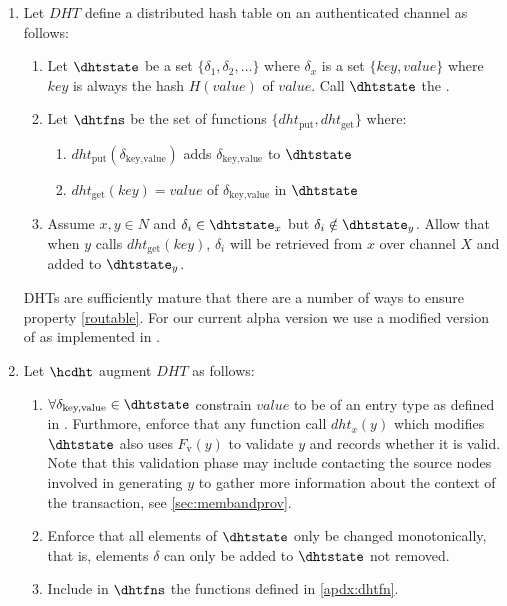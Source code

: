 \documentclass[twocolumn,showpacs,
  nofootinbib,aps,superscriptaddress,
  eqsecnum,prd,notitlepage,showkeys,10pt]{revtex4-1}
\begin{document}
\begin{enumerate}
\item Let $DHT$ define a distributed hash table on an authenticated channel as follows:
\begin{enumerate}

\item Let $\dhtstate$ be a set $\{\delta_1,\delta_2,\dots\}$ where $\delta_x$ is a set $\{key,value\}$ where $key$ is always the hash $H(value)$ of $value$.  Call $\dhtstate$ the .
\item Let $\dhtfns$ be the set of functions $\{dht_\text{put},dht_\text{get}\}$ where:
\begin{enumerate}
\item $dht_\text{put}(\delta_\text{key,value})$ adds $\delta_\text{key,value}$ to $\dhtstate$
\item $dht_\text{get}(key) = value$ of $\delta_\text{key,value}$ in $\dhtstate$
\end{enumerate}
\item \label{routable} Assume $x,y \in N$ and $\delta_i \in \dhtstate_x$ but $\delta_i \notin \dhtstate_y$. Allow that when $y$ calls $dht_\text{get}(key)$, $\delta_i$ will be retrieved from $x$ over channel $X$ and added to $\dhtstate_y$.
\end{enumerate}
DHTs are sufficiently mature that there are a number of ways to ensure property \ref{routable}.  For our current alpha version we use a modified version of \cite{kademlia} as implemented in \cite{libp2p}.

\item Let $\hcdht$ augment $DHT$ as follows:
\begin{enumerate}

\item $\forall \delta_\text{key,value} \in \dhtstate$ constrain $value$ to be of an entry type as defined in \hcdna.  Furthmore, enforce that any function call $dht_x(y)$ which modifies $\dhtstate$ also uses $F_\mathrm{v}(y)$ to validate $y$ and records whether it is valid.  Note that this validation phase may include contacting the source nodes involved in generating $y$ to gather more information about the context of the transaction, see \ref{sec:membandprov}.

\item Enforce that all elements of $\dhtstate$ only be changed monotonically, that is, elements $\delta$ can only be added to $\dhtstate$ not removed.

\item Include in $\dhtfns$ the functions defined in \ref{apdx:dhtfn}.


\end{enumerate}
\end{enumerate}
\end{document}
